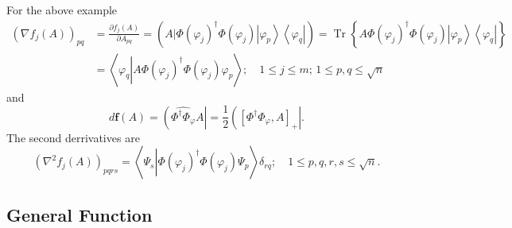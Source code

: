 \documentclass[aps,preprint]{revtex4}%
\begin{document}
For the above example
\begin{align}
\left(  \nabla f_{j}\left(  A\right)  \right)  _{pq}  &  =\frac{\partial
f_{j}\left(  A\right)  }{\partial A_{pq}}=\left(  \left.  A\right\vert
\Phi\left(  \varphi_{j}\right)  ^{\dagger}\Phi\left(  \varphi_{j}\right)
\left\vert \varphi_{p}\right\rangle \left\langle \varphi_{q}\right\vert
\right)  =\operatorname{Tr}\left\{  A\Phi\left(  \varphi_{j}\right)
^{\dagger}\Phi\left(  \varphi_{j}\right)  \left\vert \varphi_{p}\right\rangle
\left\langle \varphi_{q}\right\vert \right\} \\
&  =\left\langle \varphi_{q}\left\vert A\Phi\left(  \varphi_{j}\right)
^{\dagger}\Phi\left(  \varphi_{j}\right)  \varphi_{p}\right.  \right\rangle
;\quad1\leq j\leq m;\,1\leq p,q\leq\sqrt{n}%
\end{align}
and
\begin{equation}
d\boldsymbol{f}\left(  A\right)  =\left(  \widehat{\Phi^{\dagger}\Phi
_{\varphi}}A\right\vert =\frac{1}{2}\left(  \left[  \Phi^{\dagger}%
\Phi_{\varphi},A\right]  _{+}\right\vert .
\end{equation}
The second derrivatives are%
\begin{equation}
\left(  \nabla^{2}f_{j}\left(  A\right)  \right)  _{pqrs}=\left\langle
\Psi_{s}\left\vert \Phi\left(  \varphi_{j}\right)  ^{\dagger}\Phi\left(
\varphi_{j}\right)  \Psi_{p}\right.  \right\rangle \delta_{rq};\quad1\leq
p,q,r,s\leq\sqrt{n}.
\end{equation}


\subsection{General Function}
\end{document}
